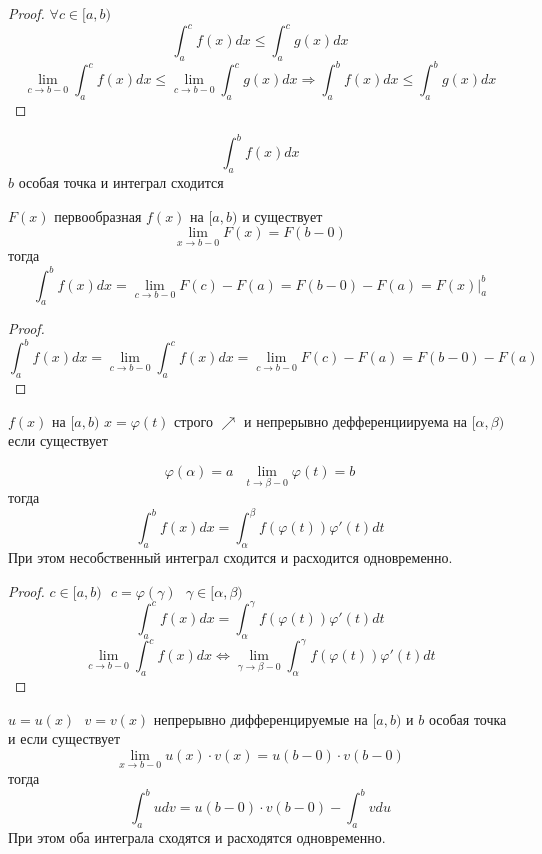 \begin{proof}
  $\forall c \in [a, b)$
  \[
    \int^{c}_{a} f(x)dx \le \int^{c}_{a} g(x)dx
  \]
  \[
    \lim_{c \to b - 0} \int^{c}_{a} f(x)dx \le \lim_{c \to b - 0}
    \int^{c}_{a} g(x)dx \Rightarrow \int^{b}_{a} f(x)dx \le \int^{b}_{a} g(x)dx
  \]
\end{proof}

\begin{theorem}
  \[
    \int^{b}_{a} f(x)dx
  \]
  $b$ особая точка и интеграл сходится

  $F(x)$ первообразная $f(x)$ на $[a, b)$ и существует
  \[
    \lim_{x \to  b - 0} F(x) = F(b - 0)
  \]
  тогда
  \[
    \int^{b}_{a} f(x)dx = \lim_{c \to b - 0} F(c) - F(a) = F(b - 0) - F(a) =
    F(x)|^{b}_{a}
  \]
\end{theorem}

\begin{proof}
  \[
    \int^{b}_{a} f(x)dx = \lim_{c \to b - 0} \int^{c}_{a} f(x)dx =
    \lim_{c \to b - 0} F(c) - F(a) = F(b - 0) - F(a)
  \]
\end{proof}

\begin{theorem}
  $f(x)$ на $[a,b)$ $x = \varphi(t)$ строго $\nearrow$ и непрерывно
  дефференциируема на $[\alpha, \beta)$ если существует

  $$
  \varphi(\alpha) = a ~~~ \lim_{t \to \beta - 0} \varphi(t) = b
  $$
  тогда
  \[
    \int^{b}_{a} f(x)dx = \int^{\beta}_{\alpha} f(\varphi(t)) \varphi'(t)dt
  \]
  При этом несобственный интеграл сходится и расходится одновременно.
\end{theorem}

\begin{proof}
  $c \in [a, b) ~~~ c = \varphi(\gamma) ~~~ \gamma \in [\alpha, \beta)$
  \[
    \int^{c}_{a} f(x)dx = \int^{\gamma}_{\alpha} f(\varphi(t)) \varphi'(t)dt
  \]
  \[
    \lim_{c \to b - 0} \int^{c}_{a} f(x)dx \Leftrightarrow
    \lim_{\gamma \to \beta - 0} \int^{\gamma}_{\alpha} f(\varphi(t))
    \varphi'(t)dt
  \]
\end{proof}

\begin{theorem}
  $u = u(x) ~~~ v = v(x)$ непрерывно дифференцируемые на $[a, b)$ и
  $b$ особая точка и если существует
  \[
    \lim_{x \to b - 0} u(x) \cdot v(x) = u(b - 0) \cdot v(b - 0)
  \]
  тогда
  \[
    \int^{b}_{a} udv = u(b - 0) \cdot v(b - 0) - \int^{b}_{a} vdu
  \]
  При этом оба интеграла сходятся и расходятся одновременно.
\end{theorem}

